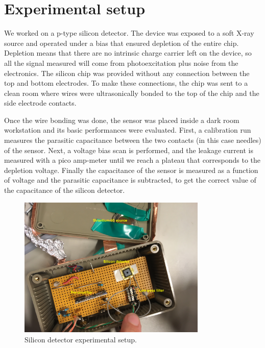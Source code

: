 \documentclass[12pt]{article}
\begin{document}
\section{Experimental setup}

We worked on a p-type silicon detector. The device was exposed to a soft X-ray source and operated under a bias that ensured depletion of the entire chip. Depletion means that there are no intrinsic charge carrier left on the device, so all the signal measured will come from photoexcitation plus noise from the electronics. The silicon chip was provided without any connection between the top and bottom electrodes. To make these connections, the chip was sent to a clean room where wires were ultrasonically bonded to the top of the chip and the side electrode contacts.

Once the wire bonding was done, the sensor was placed inside a dark room workstation and its basic performances were evaluated. First, a calibration run measures the parasitic capacitance between the two contacts (in this case needles) of the sensor. Next, a voltage bias scan is performed, and the leakage current is measured with a pico amp-meter until we reach a plateau that corresponds to the depletion voltage. Finally the capacitance of the sensor is measured as a function of voltage and the parasitic capacitance is subtracted, to get the correct value of the capacitance of the silicon detector.

\begin{figure}[htb]
  \centering
  \includegraphics[width=0.8\textwidth]{./graphics/experimentalSetup}
  \caption{Silicon detector experimental setup.}
  \label{fig:ExperimentalSetup}
\end{figure}
\end{document}
